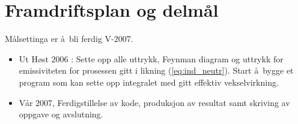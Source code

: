 \section*{Framdriftsplan og delm\aa l}
M\aa lsettinga er \aa\ bli ferdig V-2007.
\begin{itemize}
\item Ut H\o st 2006 : Sette opp alle uttrykk, Feynman diagram
og uttrykk for emissiviteten for prosessen gitt i likning 
(\ref{eq:ind_neutr}). Start \aa\ bygge et program som kan sette opp
integralet med gitt effektiv vekselvirkning.  
\item V\aa r 2007, Ferdigstillelse av kode, produksjon av resultat samt
skriving av oppgave og avslutning.

\end{itemize}
